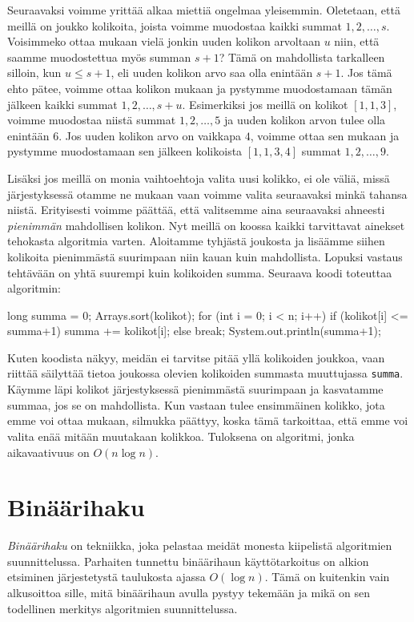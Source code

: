Seuraavaksi voimme yrittää alkaa miettiä ongelmaa yleisemmin.
Oletetaan, että meillä on joukko kolikoita,
joista voimme muodostaa kaikki summat $1,2,\dots,s$.
Voisimmeko ottaa mukaan vielä jonkin uuden kolikon arvoltaan $u$ niin,
että saamme muodostettua myös summan $s+1$?
Tämä on mahdollista tarkalleen silloin, kun $u \le s+1$,
eli uuden kolikon arvo saa olla enintään $s+1$.
Jos tämä ehto pätee, voimme ottaa kolikon mukaan ja
pystymme muodostamaan tämän jälkeen kaikki summat $1,2,\dots,s+u$.
Esimerkiksi jos meillä on kolikot $[1,1,3]$, voimme muodostaa
niistä summat $1,2,\dots,5$ ja uuden kolikon arvon tulee olla enintään $6$.
Jos uuden kolikon arvo on vaikkapa $4$, voimme ottaa sen mukaan ja
pystymme muodostamaan sen jälkeen kolikoista $[1,1,3,4]$ summat $1,2,\dots,9$.

Lisäksi jos meillä on monia vaihtoehtoja valita uusi kolikko,
ei ole väliä, missä järjestyksessä otamme ne mukaan vaan
voimme valita seuraavaksi minkä tahansa niistä.
Erityisesti voimme päättää, että valitsemme aina
seuraavaksi ahneesti \emph{pienimmän} mahdollisen kolikon.
Nyt meillä on koossa kaikki tarvittavat ainekset
tehokasta algoritmia varten.
Aloitamme tyhjästä joukosta ja lisäämme siihen kolikoita
pienimmästä suurimpaan niin kauan kuin mahdollista.
Lopuksi vastaus tehtävään on yhtä suurempi kuin kolikoiden
summa.
Seuraava koodi toteuttaa algoritmin:

\begin{code}
long summa = 0;
Arrays.sort(kolikot);
for (int i = 0; i < n; i++) {
    if (kolikot[i] <= summa+1) {
        summa += kolikot[i];
    } else {
        break;
    }
}
System.out.println(summa+1);
\end{code}

Kuten koodista näkyy, meidän ei tarvitse pitää yllä
kolikoiden joukkoa, vaan riittää säilyttää tietoa
joukossa olevien kolikoiden summasta muuttujassa \texttt{summa}.
Käymme läpi kolikot järjestyksessä pienimmästä suurimpaan
ja kasvatamme summaa, jos se on mahdollista.
Kun vastaan tulee ensimmäinen kolikko, jota emme voi ottaa mukaan,
silmukka päättyy, koska tämä tarkoittaa,
että emme voi valita enää mitään muutakaan kolikkoa.
Tuloksena on algoritmi, jonka aikavaativuus on $O(n \log n)$.

\section{Binäärihaku}

\emph{Binäärihaku} on tekniikka, joka pelastaa meidät monesta
kiipelistä algoritmien suunnittelussa.
Parhaiten tunnettu binäärihaun käyttötarkoitus on alkion
etsiminen järjestetystä taulukosta ajassa $O(\log n)$.
Tämä on kuitenkin vain alkusoittoa sille,
mitä binäärihaun avulla pystyy tekemään ja mikä on sen
todellinen merkitys algoritmien suunnittelussa.

